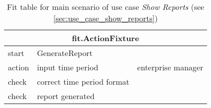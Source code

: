 
\begin{table}[H]
\begin{centering}
\begin{tabular}{|l|l|l|}

\hline  \multicolumn{3}{|c|}{fit.ActionFixture} \\
\hline start & GenerateReport &  \\ 
\hline action & input time period & enterprise manager \\ 
\hline check & correct time period format &  \\ 
\hline check & report generated &  \\ 
\hline 
\end{tabular}

\caption{Fit table for main scenario of use case \emph{Show Reports} (see \autoref{sec:use_case_show_reports})}
 
\par\end{centering}
\end{table}
